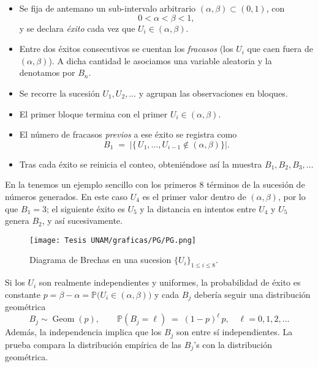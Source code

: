 \documentclass[../Main.tex]{subfiles}
\begin{document}
\begin{itemize}
    \item Se fija de antemano un sub-intervalo arbitrario $(\alpha,\beta)\subset(0,1)$,
        con $$0<\alpha<\beta<1,$$ y se declara \emph{éxito} cada vez que
        $U_i\in(\alpha,\beta)$.
    \item Entre dos éxitos consecutivos se cuentan los \emph{fracasos}
        (los $U_i$ que caen fuera de $(\alpha,\beta)$).  
        A dicha cantidad le asociamos una variable aleatoria y la denotamos por $B_n$.
        
    \item Se recorre la sucesión $U_{1},U_{2},\dots$ y agrupan las observaciones en bloques.
    
    \item El primer bloque termina con el primer $U_i\in(\alpha,\beta)$.
          \item El número de fracasos \emph{previos} a ese éxito se registra como
                \[
                    B_{1} \;=\;
                    |\{\,U_1,\dots,U_{i-1}\notin(\alpha,\beta)\}|.
                \]
    \item Tras cada éxito se reinicia el conteo, obteniéndose así la muestra
                $B_1,B_2,B_3,\dots$
    \end{itemize}
    
En la  tenemos un ejemplo sencillo con los primeros 8 términos de la sucesión de números generados. En este caso $U_{4}$ es el primer valor dentro de $(\alpha,\beta)$, por lo que $B_{1}=3$; el siguiente éxito es $U_{5}$ y la distancia en intentos entre $U_{4}$ y $U_{5}$ genera $B_{2}$, y así sucesivamente. \\

\begin{figure}[h!]                   \texttt{[image: Tesis UNAM/graficas/PG/PG.png]}
        \centering
         \caption{Diagrama de Brechas en una sucesion $\{U_i\}_{1\leq i\leq 8}$.}
         \label{fig:brech}
    \end{figure}


Si los $U_i$ son realmente independientes y uniformes,
la probabilidad de éxito es constante $p=\beta-\alpha=\mathbb{P}\bigl(U_i \in (\alpha,\beta)\bigr)$
y cada $B_j$ debería seguir una distribución geométrica
      \[
            B_j \sim \operatorname{Geom}(p),
            \qquad
            \mathbb{P}(B_j = \ell) \;=\; (1-p)^{\ell}\,p,
            \quad \ell = 0,1,2,\dots
        \]
Además, la independencia implica que los $B_j$ son entre sí independientes.
La prueba compara la distribución empírica de las $B_j$'s con la distribución geométrica. 
\end{document}
